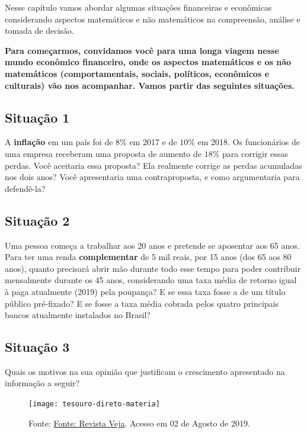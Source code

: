 Nesse capítulo vamos abordar algumas situações financeiras e econômicas considerando aspectos matemáticos e não matemáticos na compreensão, análise e tomada de decisão.

\textbf{Para começarmos, convidamos você para uma longa viagem nesse mundo econômico financeiro, onde os aspectos matemáticos e os não matemáticos (comportamentais, sociais, políticos, econômicos e culturais) vão nos acompanhar. Vamos partir das seguintes situações.}

\subsection{Situação 1}
A \textbf{inflação} em um país foi de $8\%$ em 2017 e de $10\%$ em 2018. Os funcionários de uma empresa receberam uma proposta de aumento de $18\%$ para corrigir essas perdas. Você aceitaria essa proposta? Ela realmente corrige as perdas acumuladas nos dois anos? Você apresentaria uma contraproposta, e como argumentaria para defendê-la?


\subsection{Situação 2}
Uma pessoa começa a trabalhar aos 20 anos e pretende se aposentar aos 65 anos. Para ter uma renda \textbf{complementar} de 5 mil reais, por 15 anos (dos 65 aos 80 anos), quanto precisará abrir mão durante todo esse tempo para poder contribuir mensalmente durante os 45 anos, considerando uma taxa média de retorno igual à paga atualmente (2019) pela poupança? E se essa taxa fosse a de um título público pré-fixado? E se fosse a taxa média cobrada pelos quatro principais bancos atualmente instalados no Brasil? 


\subsection{Situação 3}
Quais os motivos na sua opinião que justificam o crescimento apresentado na informação a seguir?


\begin{figure}[H]
\centering
\noindent\texttt{[image: tesouro-direto-materia]}

\caption{Fonte: \href{https://veja.abril.com.br/economia/investidores-no-tesouro-direto-crescem-36-no-primeiro-semestre/}{Fonte: Revista Veja}. Acesso em 02 de Agosto de 2019.}
\end{figure}



